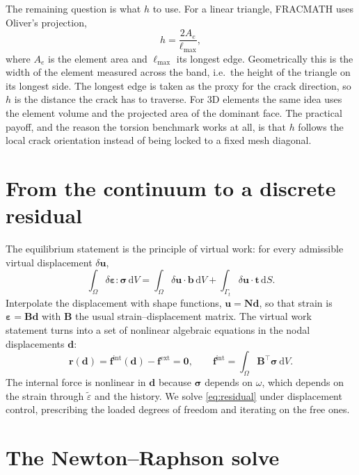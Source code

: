 \documentclass[11pt]{article}
\newcommand{\eps}{\bm{\varepsilon}}
\newcommand{\sig}{\bm{\sigma}}
\newcommand{\eqs}{\tilde{\varepsilon}}
\newcommand{\dd}{\,\mathrm{d}}
\begin{document}
The remaining question is what $h$ to use. For a linear triangle, FRACMATH uses Oliver's
projection,
%
\begin{equation}
h = \frac{2A_e}{\ell_{\max}},
\end{equation}
%
where $A_e$ is the element area and $\ell_{\max}$ its longest edge. Geometrically this is
the width of the element measured across the band, i.e.\ the height of the triangle on its
longest side. The longest edge is taken as the proxy for the crack direction, so $h$ is the
distance the crack has to traverse. For 3D elements the same idea uses the element volume
and the projected area of the dominant face. The practical payoff, and the reason the
torsion benchmark works at all, is that $h$ follows the local crack orientation instead of
being locked to a fixed mesh diagonal.

\section{From the continuum to a discrete residual}

The equilibrium statement is the principle of virtual work: for every admissible virtual
displacement $\delta\bm u$,
%
\begin{equation}
\int_\Omega \delta\eps : \sig \dd V
= \int_\Omega \delta\bm u\cdot\bm b \dd V
+ \int_{\Gamma_t}\delta\bm u\cdot\bm t \dd S .
\end{equation}
%
Interpolate the displacement with shape functions, $\bm u = \bm N\bm d$, so that strain is
$\eps = \bm B\bm d$ with $\bm B$ the usual strain--displacement matrix. The virtual work
statement turns into a set of nonlinear algebraic equations in the nodal displacements
$\bm d$:
%
\begin{equation}
\bm r(\bm d) = \bm f^{\text{int}}(\bm d) - \bm f^{\text{ext}} = \bm 0,
\qquad
\bm f^{\text{int}} = \int_\Omega \bm B^{\!\top}\sig \dd V .
\label{eq:residual}
\end{equation}
%
The internal force is nonlinear in $\bm d$ because $\sig$ depends on $\omega$, which depends
on the strain through $\eqs$ and the history. We solve \eqref{eq:residual} under
displacement control, prescribing the loaded degrees of freedom and iterating on the free
ones.

\section{The Newton--Raphson solve}
\end{document}
